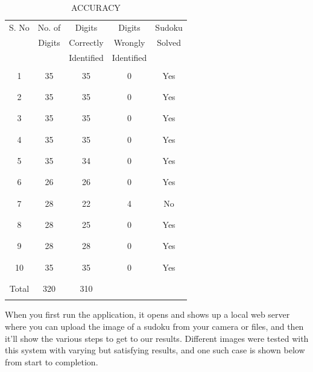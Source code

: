 \documentclass[conference]{IEEEtran}
\begin{document}
\begin{table}[htbp]
\caption{ACCURACY}
\begin{center}
\begin{tabular}{|c|c|c|c|c|}
\hline
S. No & No. of & Digits & Digits  & Sudoku \\
 & Digits & Correctly & Wrongly & Solved \\
 & & Identified & Identified & \\
\hline
& & & & \\
1 & 35 & 35 & 0 & Yes \\
& & & & \\
\hline
& & & & \\
2 & 35 & 35 & 0 & Yes \\
& & & & \\
\hline
& & & & \\
3 & 35 & 35 & 0 & Yes \\
& & & & \\
\hline
& & & & \\
4 & 35 & 35 & 0 & Yes \\
& & & & \\
\hline
& & & & \\
5 & 35 & 34 & 0 & Yes \\
& & & & \\
\hline
& & & & \\
6 & 26 & 26 & 0 & Yes \\
& & & & \\
\hline
& & & & \\
7 & 28 & 22 & 4 & No \\
& & & & \\
\hline
& & & & \\
8 & 28 & 25 & 0 & Yes \\
& & & & \\
\hline
& & & & \\
9 & 28 & 28 & 0 & Yes \\
& & & & \\
\hline
& & & & \\
10 & 35 & 35 & 0 & Yes \\
& & & & \\
\hline
& & & & \\
Total & 320 & 310 & & \\
& & & & \\
\hline
\end{tabular}
\label{tab1}
\end{center}
\end{table}

When you first run the application, it opens and shows up a local web server where you can upload the image of a sudoku from your camera or files, and then it'll show the various steps to get to our results. Different images were tested with this system with varying but satisfying results, and one such case is shown below from start to completion.
\end{document}
